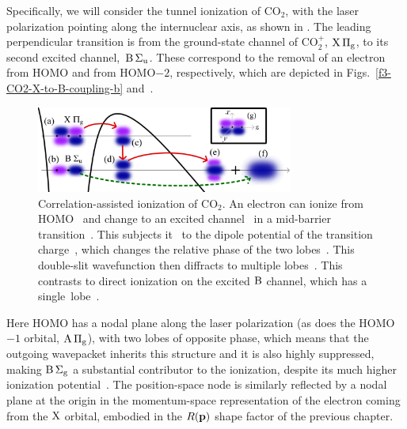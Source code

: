 Specifically, we will consider the tunnel ionization of CO$_2$, with the laser polarization pointing along the internuclear axis, as shown in . The leading perpendicular transition is from the ground-state channel of CO${}_2^+$, $\mathrm{X}\,\Pi_\mathrm{g}$, to its second excited channel,~$\mathrm{B}\,\Sigma_\mathrm{u}$. These correspond to the removal of an electron from HOMO and from HOMO$-2$, respectively, which are depicted in Figs.~\ref{f3-CO2-X-to-B-coupling-b} and~.

\begin{figure}[htbp]
  \centering
  \subfigure{\label{f3-CO2-X-to-B-coupling-a}}
  \subfigure{\label{f3-CO2-X-to-B-coupling-b}}
  \subfigure{\label{f3-CO2-X-to-B-coupling-c}}
  \subfigure{\label{f3-CO2-X-to-B-coupling-d}}
  \subfigure{\label{f3-CO2-X-to-B-coupling-e}}
  \subfigure{\label{f3-CO2-X-to-B-coupling-f}}
  \subfigure{\label{f3-CO2-X-to-B-coupling-g}}
  \includegraphics[width=0.75\textwidth]{3-Multi-channel/Figures/figure3C.png}
  \caption[Scheme for the correlation-assisted tunnelling of aligned CO$_2$, with the direct $\B$ channel competing with cross-channel contributions that start in the $\X$ channel.]{
  Correlation-assisted ionization of CO$_2$. An electron can ionize from HOMO~\protect{} and change to an excited channel~\protect{} in a mid-barrier transition~\protect{}. This subjects it~\protect{} to the dipole potential of the transition charge~\protect{}, which changes the relative phase of the two lobes~\protect{}. This double-slit wavefunction then diffracts to multiple lobes~\protect{}. This contrasts to direct ionization on the excited $\B$ channel, which has a single~lobe~\protect{}.
  }
\label{f3-CO2-X-to-B-coupling}
\end{figure}

Here HOMO has a nodal plane along the laser polarization (as does the HOMO$-1$ \mbox{orbital}, $\mathrm{A}\,\Pi_\mathrm{g}$), with two lobes of opposite phase, which means that the outgoing wavepacket inherits this structure and it is also highly suppressed, making $\mathrm{B}\,\Sigma_\mathrm{g}$ a substantial contributor to the ionization, despite its much higher ionization potential~\cite{meckel_LIED_2008, smirnova_multielectron-hhg_2009, mairesse_high-harmonic-spectroscopy_2010}. The position-space node is similarly reflected by a nodal plane at the origin in the momentum-space representation of the electron coming from the $\X$ orbital, embodied in the $R(\vb{p})$ shape factor of the previous chapter.

